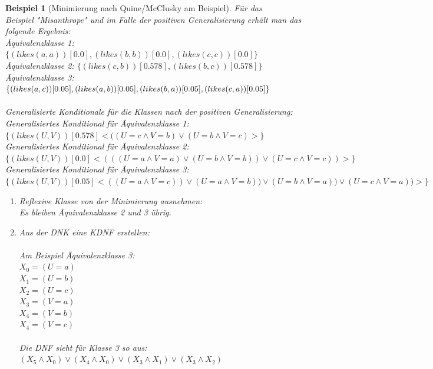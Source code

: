 \documentclass[draft]{scrreprt}
\newtheorem{Bsp}{Beispiel}[section]
\begin{document}
\begin{Bsp}[Minimierung nach Quine/McClusky am Beispiel]
	Für das \\ Beispiel "{}Misanthrope"{} und im Falle der positiven Generalisierung erhält man das folgende Ergebnis:\\
	Äquivalenzklasse 1: $ \{(likes(a,a))[0.0], (likes(b,b))[0.0], (likes(c,c))[0.0]\} $\\
	Äquivalenzklasse 2: $ \{(likes(c,b))[0.578], (likes(b,c))[0.578]\} $\\
	Äquivalenzklasse 3: $ \{(likes(a,c))[0.05], (likes(a,b))[0.05], (likes(b,a))[0.05],\\ (likes(c,a))[0.05]\} $\\
	\\
	\noindent
	Generalisierte Konditionale für die Klassen nach der positiven Generalisierung:\\
	Generalisiertes Konditional für Äquivalenzklasse 1: $ \{(likes(U,V))[0.578] <((U = c \land V = b) \lor (U = b \land V = c)>\} $\\
	Generalisiertes Konditional für Äquivalenzklasse 2: $ \{(likes(U,V))[0.0] <(((U = a \land V = a) \lor (U = b \land V = b)) \lor (U = c \land V = c)) >\} $\\
	Generalisiertes Konditional für Äquivalenzklasse 3: $ \{(likes(U,V))[0.05] <((U = a \land V = c)) \lor (U = a \land V = b)) \lor (U = b \land V = a)) \lor (U = c \land V = a))>\} $\\
	\begin{enumerate}
		\item Reflexive Klasse von der Minimierung ausnehmen:\\
		Es bleiben Äquivalenzklasse 2 und 3 übrig.	
		\item Aus der DNK eine KDNF erstellen:\\\\
		Am Beispiel Äquivalenzklasse 3:\\
		$ X_0 = (U = a) $\\
		$ X_1 = (U = b) $\\
		$ X_2 = (U = c) $\\
		$ X_3 = (V = a) $\\
		$ X_4 = (V = b) $\\
		$ X_4 = (V = c) $\\
		\\
		\noindent
		Die DNF sieht für Klasse 3 so aus:\\
		$ (X_5 \land X_0) \lor (X_4 \land X_0) \lor (X_3 \land X_1) \lor (X_3 \land X_2) $
		\begin{footnotesize}

\end{footnotesize}
\end{enumerate}
\end{Bsp}
\end{document}

